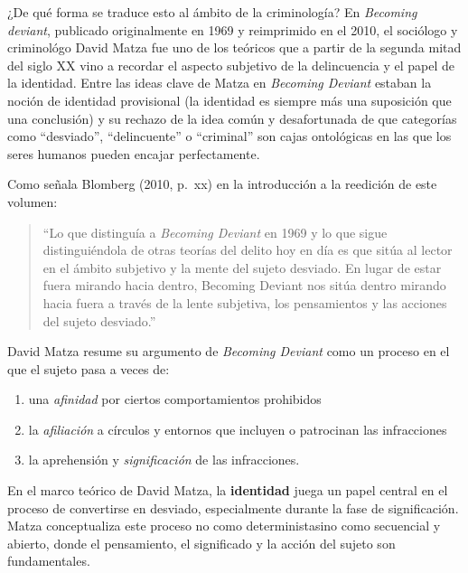 \documentclass[
  spanish,
  letterpaper,
  DIV=11,
  numbers=noendperiod]{scrreprt}
\begin{document}
¿De qué forma se traduce esto al ámbito de la criminología? En
\emph{Becoming deviant}, publicado originalmente en 1969 y reimprimido
en el 2010, el sociólogo y criminológo David Matza fue uno de los
teóricos que a partir de la segunda mitad del siglo XX vino a recordar
el aspecto subjetivo de la delincuencia y el papel de la identidad.
Entre las ideas clave de Matza en \emph{Becoming Deviant} estaban la
noción de identidad provisional (la identidad es siempre más una
suposición que una conclusión) y su rechazo de la idea común y
desafortunada de que categorías como ``desviado'', ``delincuente'' o
``criminal'' son cajas ontológicas en las que los seres humanos pueden
encajar perfectamente.

Como señala Blomberg (2010, p.~xx) en la introducción a la reedición de
este volumen:

\begin{quote}
``Lo que distinguía a \emph{Becoming Deviant} en 1969 y lo que sigue
distinguiéndola de otras teorías del delito hoy en día es que sitúa al
lector en el ámbito subjetivo y la mente del sujeto desviado. En lugar
de estar fuera mirando hacia dentro, Becoming Deviant nos sitúa dentro
mirando hacia fuera a través de la lente subjetiva, los pensamientos y
las acciones del sujeto desviado.''
\end{quote}

David Matza resume su argumento de \emph{Becoming Deviant} como un
proceso en el que el sujeto pasa a veces de:

\begin{enumerate}
\def\labelenumi{\arabic{enumi}.}
\item
  una \emph{afinidad} por ciertos comportamientos prohibidos
\item
  la \emph{afiliación} a círculos y entornos que incluyen o patrocinan
  las infracciones
\item
  la aprehensión y \emph{significación} de las infracciones.
\end{enumerate}

En el marco teórico de David Matza, la \textbf{identidad} juega un papel
central en el proceso de convertirse en desviado, especialmente durante
la fase de significación. Matza conceptualiza este proceso no como
deterministasino como secuencial y abierto, donde el pensamiento, el
significado y la acción del sujeto son fundamentales.
\end{document}
